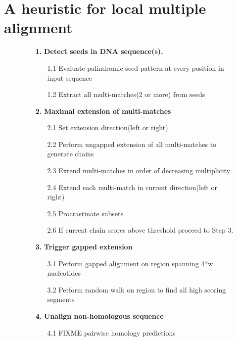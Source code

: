 \documentclass{llncs}
\begin{document}
\section{A heuristic for local multiple alignment}
\begin{figure}[t]
\begin{center}
\hfill
\scriptsize
\begin{minipage}[t]{.50\textwidth}
\begin{flushleft}

\begin{enumerate}
\item[\textbf{1.}] \textbf{Detect seeds in DNA sequence(s).}
\begin{enumerate}

\item[1.1] Evaluate palindromic seed pattern at every position in input sequence
\item[1.2] Extract all multi-matches(2 or more) from seeds
\end{enumerate}
\item[\textbf{2.}] \textbf{Maximal extension of multi-matches}
\begin{enumerate}

\item[2.1] Set extension direction(left or right)
\item[2.2] Perform ungapped extension of all multi-matches to generate chains
\item[2.3] Extend multi-matches in order of decreasing multiplicity 
\item[2.4] Extend each multi-match in current direction(left or right)
\item[2.5] Procrastinate subsets
\item[2.6] If current chain scores above threshold proceed to Step 3.
\end{enumerate}
\item[\textbf{3.}] \textbf{Trigger gapped extension}
\begin{enumerate}
\item[3.1] Perform gapped alignment on region spanning 4*w nucleotides 
\item[3.2] Perform random walk on region to find all high scoring segments
\end{enumerate}
\item[\textbf{4.}] \textbf{Unalign non-homologous sequence}
\begin{enumerate}
\item[4.1] FIXME pairwise homology predictions
\end{enumerate}


\end{enumerate}
\end{flushleft}
\end{minipage}
\end{center}
\end{figure}
\end{document}
